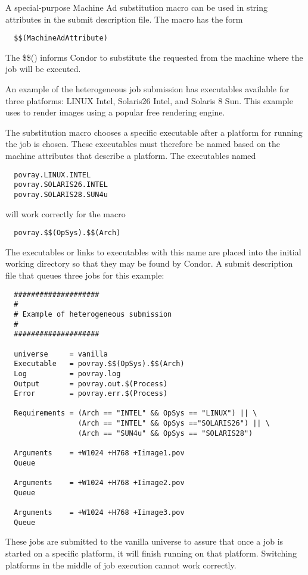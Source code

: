 A special-purpose Machine Ad substitution macro can be used in
string
attributes in the submit description file.
The macro has the form
\begin{verbatim}
  $$(MachineAdAttribute)
\end{verbatim}
The \$\$() informs Condor to substitute the requested 
from the machine where the job will be executed.

An example of the heterogeneous job submission
has executables available for three platforms:
LINUX Intel, Solaris26 Intel, and Solaris 8 Sun.
This example uses 
to render images using a popular free rendering engine.

The substitution macro chooses a specific executable after
a platform for running the job is chosen.
These executables must therefore be named based on the
machine attributes that describe a platform.
The executables named \begin{verbatim}
  povray.LINUX.INTEL
  povray.SOLARIS26.INTEL
  povray.SOLARIS28.SUN4u
\end{verbatim}
will work correctly for the macro
\begin{verbatim}
  povray.$$(OpSys).$$(Arch)
\end{verbatim}

The executables or links to executables with this name
are placed into the initial working directory so that they may be
found by Condor. 
A submit description file that queues three jobs for this example:

\begin{verbatim}
  ####################
  #
  # Example of heterogeneous submission
  #
  ####################

  universe     = vanilla
  Executable   = povray.$$(OpSys).$$(Arch)
  Log          = povray.log
  Output       = povray.out.$(Process)
  Error        = povray.err.$(Process)

  Requirements = (Arch == "INTEL" && OpSys == "LINUX") || \
                 (Arch == "INTEL" && OpSys =="SOLARIS26") || \
                 (Arch == "SUN4u" && OpSys == "SOLARIS28")

  Arguments    = +W1024 +H768 +Iimage1.pov
  Queue 

  Arguments    = +W1024 +H768 +Iimage2.pov
  Queue 

  Arguments    = +W1024 +H768 +Iimage3.pov
  Queue 
\end{verbatim}

These jobs are submitted to the vanilla universe
to assure that once a job is started on a specific platform,
it will finish running on that platform.
Switching platforms in the middle of job execution cannot
work correctly.

